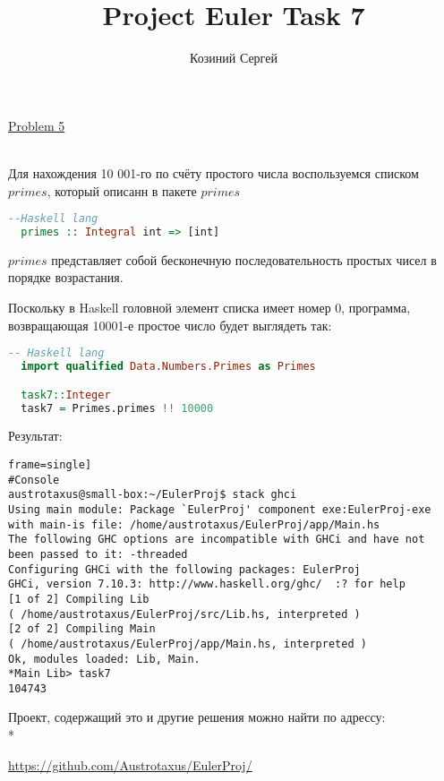 \documentclass[11pt,a4paper]{article}
\title{Project Euler Task 7}
\author{Козиний Сергей}
\begin{document}
    
\maketitle
\href{''https://projecteuler.net/problem=5''}{Problem 5}

\\

Для нахождения 10 001-го по счёту простого числа воспользуемся списком $primes$, который описанн в пакете $primes$

\begin{lstlisting}[language=Haskell, frame=single]
  --Haskell lang
  primes :: Integral int => [int]
\end{lstlisting} 

$primes$ представляет собой бесконечную последовательность простых чисел в порядке возрастания.

Поскольку в Haskell головной элемент списка имеет номер 0, программа, возвращающая 10001-е простое число будет выглядеть так:

\begin{lstlisting}[language=Haskell, frame=single]
  -- Haskell lang
  import qualified Data.Numbers.Primes as Primes

  task7::Integer
  task7 = Primes.primes !! 10000
\end{lstlisting}

Результат:
\begin{lstlisting}frame=single]
#Console
austrotaxus@small-box:~/EulerProj$ stack ghci
Using main module: Package `EulerProj' component exe:EulerProj-exe
with main-is file: /home/austrotaxus/EulerProj/app/Main.hs
The following GHC options are incompatible with GHCi and have not
been passed to it: -threaded
Configuring GHCi with the following packages: EulerProj
GHCi, version 7.10.3: http://www.haskell.org/ghc/  :? for help
[1 of 2] Compiling Lib
( /home/austrotaxus/EulerProj/src/Lib.hs, interpreted )
[2 of 2] Compiling Main
( /home/austrotaxus/EulerProj/app/Main.hs, interpreted )
Ok, modules loaded: Lib, Main. 
*Main Lib> task7
104743
\end{lstlisting}


Проект, содержащий это и другие решения можно найти по адрессу:\\*

\url{https://github.com/Austrotaxus/EulerProj/}
\end{document}
